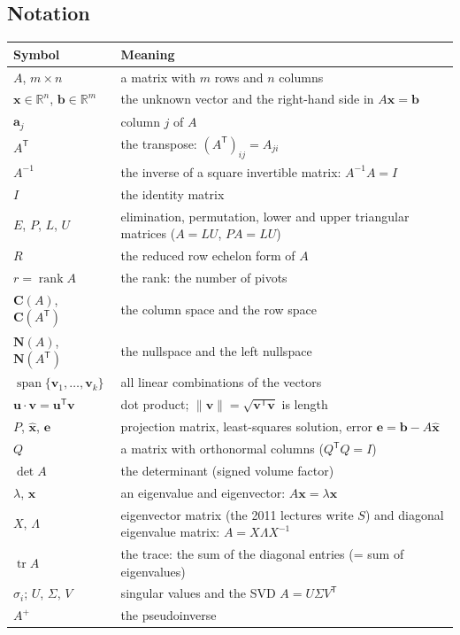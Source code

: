 \documentclass[11pt]{article}
\theoremstyle{definition}
\theoremstyle{plain}
\theoremstyle{remark}
\newcommand{\vb}[1]{\boldsymbol{#1}}          %
\newcommand{\T}{^{\mathsf{T}}}                 %
\DeclareMathOperator{\rank}{rank}
\DeclareMathOperator{\tr}{tr}
\DeclareMathOperator{\Span}{span}
\newcommand{\Col}[1]{\mathbf{C}(#1)}            %
\newcommand{\Nul}[1]{\mathbf{N}(#1)}            %
\newcommand{\R}{\mathbb{R}}
\begin{document}
\subsection*{Notation}
\begin{longtable}{@{}p{}p{}@{}}
\toprule
Symbol & Meaning \\
\midrule
$A$, $m\times n$ & a matrix with $m$ rows and $n$ columns \\
$\vb{x}\in\R^n$, $\vb{b}\in\R^m$ & the unknown vector and the right-hand side in $A\vb{x}=\vb{b}$ \\
$\vb{a}_j$ & column $j$ of $A$ \\
$A\T$ & the transpose: $(A\T)_{ij}=A_{ji}$ \\
$A^{-1}$ & the inverse of a square invertible matrix: $A^{-1}A=I$ \\
$I$ & the identity matrix \\
$E$, $P$, $L$, $U$ & elimination, permutation, lower and upper triangular matrices ($A=LU$, $PA=LU$) \\
$R$ & the reduced row echelon form of $A$ \\
$r=\rank A$ & the rank: the number of pivots \\
$\Col{A}$, $\Col{A\T}$ & the column space and the row space \\
$\Nul{A}$, $\Nul{A\T}$ & the nullspace and the left nullspace \\
$\Span\{\vb{v}_1,\dots,\vb{v}_k\}$ & all linear combinations of the vectors \\
$\vb{u}\cdot\vb{v}=\vb{u}\T\vb{v}$ & dot product; $\|\vb{v}\|=\sqrt{\vb{v}\T\vb{v}}$ is length \\
$P$, $\hat{\vb{x}}$, $\vb{e}$ & projection matrix, least-squares solution, error $\vb{e}=\vb{b}-A\hat{\vb{x}}$ \\
$Q$ & a matrix with orthonormal columns ($Q\T Q=I$) \\
$\det A$ & the determinant (signed volume factor) \\
$\lambda$, $\vb{x}$ & an eigenvalue and eigenvector: $A\vb{x}=\lambda\vb{x}$ \\
$X$, $\Lambda$ & eigenvector matrix (the 2011 lectures write $S$) and diagonal eigenvalue matrix: $A=X\Lambda X^{-1}$ \\
$\tr A$ & the trace: the sum of the diagonal entries (= sum of eigenvalues) \\
$\sigma_i$; $U$, $\Sigma$, $V$ & singular values and the SVD $A=U\Sigma V\T$ \\
$A^{+}$ & the pseudoinverse \\
\bottomrule
\end{longtable}
\addtocounter{table}{-1}%
\clearpage
\end{document}
